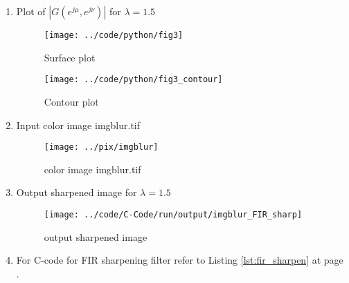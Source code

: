 \documentclass[a4paper,11pt]{article}
\newcommand{\reflst}[1]{Listing \ref{#1} at page \pageref{#1}}
\begin{document}
\begin{enumerate}
\newpage
\item Plot of $|G(e^{j\mu},e^{j\nu})|$ for $\lambda=1.5$
\begin{figure}[!hp]
 \centering
 \texttt{[image: ../code/python/fig3]}
 \caption{Surface plot}
\end{figure}

\begin{figure}[!hp]
 \centering
 \texttt{[image: ../code/python/fig3\_contour]}
 \caption{Contour plot}
\end{figure}

\newpage
\item Input color image imgblur.tif
\begin{figure}[!hp]
 \centering
 \texttt{[image: ../pix/imgblur]}
 \caption{color image imgblur.tif}
\end{figure}

\newpage
\item Output sharpened image for $\lambda=1.5$
\begin{figure}[!hp]
\centering
\texttt{[image: ../code/C-Code/run/output/imgblur\_FIR\_sharp]}
\caption{output sharpened image}
\end{figure}

\item For C-code for FIR sharpening filter refer to \reflst{lst:fir_sharpen}.
\end{enumerate}

%
\clearpage
\vspace{2ex}
%
\end{document}
